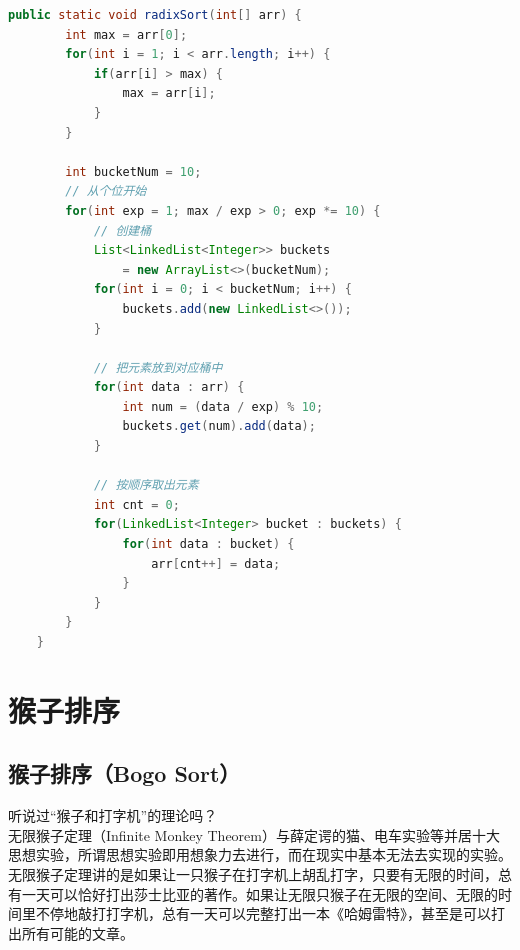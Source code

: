 
\begin{lstlisting}[language=Java]
public static void radixSort(int[] arr) {
        int max = arr[0];
        for(int i = 1; i < arr.length; i++) {
            if(arr[i] > max) {
                max = arr[i];
            }
        }

        int bucketNum = 10;
        // 从个位开始
        for(int exp = 1; max / exp > 0; exp *= 10) {
            // 创建桶
            List<LinkedList<Integer>> buckets 
                = new ArrayList<>(bucketNum);
            for(int i = 0; i < bucketNum; i++) {
                buckets.add(new LinkedList<>());
            }

            // 把元素放到对应桶中
            for(int data : arr) {
                int num = (data / exp) % 10;
                buckets.get(num).add(data);
            }

            // 按顺序取出元素
            int cnt = 0;
            for(LinkedList<Integer> bucket : buckets) {
                for(int data : bucket) {
                    arr[cnt++] = data;
                }
            }
        }
    }
\end{lstlisting}

\newpage

\section{猴子排序}

\subsection{猴子排序（Bogo Sort）}

听说过“猴子和打字机”的理论吗？\\

无限猴子定理（Infinite Monkey Theorem）与薛定谔的猫、电车实验等并居十大思想实验，所谓思想实验即用想象力去进行，而在现实中基本无法去实现的实验。\\

无限猴子定理讲的是如果让一只猴子在打字机上胡乱打字，只要有无限的时间，总有一天可以恰好打出莎士比亚的著作。如果让无限只猴子在无限的空间、无限的时间里不停地敲打打字机，总有一天可以完整打出一本《哈姆雷特》，甚至是可以打出所有可能的文章。


